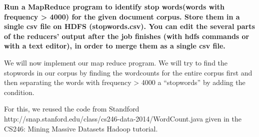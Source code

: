 \documentclass{article}
\begin{document}
\noindent\textbf{Run a MapReduce program to identify stop words(words with frequency \textgreater{} 4000) 
for   the given   document   corpus. Store   them   in   a   single   csv   file   on   HDFS
(stopwords.csv).
You can edit the several parts of the reducers’ output after the job 
finishes (with hdfs commands or with a text editor), in order to merge them as a single 
csv file.}%

We will now implement our map reduce program. We will try to find the stopwords in our corpus by finding 
the wordcounts for the entire corpus first and then separating the words with frequency \textgreater{} 4000 a \textquotedblleft{}stopwords\textquotedblright{} by adding the condition.%

For this, we reused the code from Standford http://snap.stanford.edu/class/cs246-data-2014/WordCount.java given in the CS246: Mining Massive Datasets Hadoop tutorial.%
\end{document}
